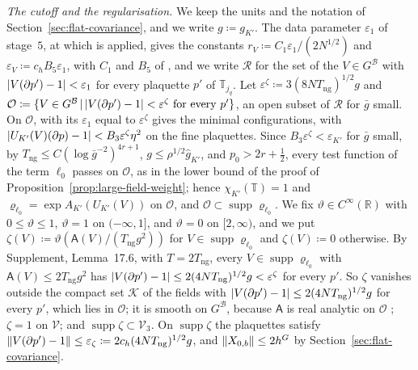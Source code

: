 \documentclass[11pt]{preprint}
\DeclarePairedDelimiter{\abs}{\lvert}{\rvert}
\DeclarePairedDelimiter{\norm}{\lVert}{\rVert}
\numberwithin{equation}{section}
\theoremstyle{definition}
\theoremstyle{remark}
\theoremstyle{plain}
\begin{document}
\emph{The cutoff and the regularisation.} We keep the units and the notation of Section~\ref{sec:flat-covariance}, and we write $g \coloneqq g_{K'}$. The data parameter $\varepsilon_1$ of stage~$5$, at which \cite[Theorem~1, p.~279]{BalabanVAR} is applied, gives the constants $r_V \coloneqq C_1\varepsilon_1/(2N^{1/2})$ and $\varepsilon_V \coloneqq c_hB_5\varepsilon_1$, with $C_1$ and $B_5$ of \cite[(172)--(173), p.~305]{BalabanVAR}, and we write $\mathcal R$ for the set of the $V \in G^{\mathcal B}$ with $\abs{V(\partial p') - 1} < \varepsilon_1$ for every plaquette $p'$ of $\mathbb T_{j_q}$. Let $\varepsilon^\zeta \coloneqq 3(8NT_{\mathrm{ng}})^{1/2}g$ and $\mathcal O \coloneqq \{ V \in G^{\mathcal B} \,|\, \abs{V(\partial p') - 1} < \varepsilon^\zeta \text{ for every } p' \}$, an open subset of $\mathcal R$ for $\bar g$ small. On $\mathcal O$, \cite[Theorem~1]{BalabanVAR} with its $\varepsilon_1$ equal to $\varepsilon^\zeta$ gives the minimal configurations, with $\abs{U_{K'}(V)(\partial p) - 1} < B_3\varepsilon^\zeta\eta^2$ on the fine plaquettes. Since $B_3\varepsilon^\zeta < \varepsilon_{K'}$ for $\bar g$ small, by $T_{\mathrm{ng}} \leq C(\log\bar g^{-2})^{4r+1}$, $g \leq \rho^{1/2}\hat g_{K'}$, and $p_0 > 2r + \frac12$, every test function of the term $\ell_0$ passes on $\mathcal O$, as in the lower bound of the proof of Proposition~\ref{prop:large-field-weight}; hence $\chi_{K'}(\mathbb T) = 1$ and $\varrho_{\ell_0} = \exp A_{K'}(U_{K'}(V))$ on $\mathcal O$, and $\mathcal O \subset \operatorname{supp}\varrho_{\ell_0}$. We fix $\vartheta \in C^\infty(\mathbb R)$ with $0 \leq \vartheta \leq 1$, $\vartheta = 1$ on $(-\infty, 1]$, and $\vartheta = 0$ on $[2, \infty)$, and we put $\zeta(V) \coloneqq \vartheta(\mathsf A(V)/(T_{\mathrm{ng}}g^2))$ for $V \in \operatorname{supp}\varrho_{\ell_0}$ and $\zeta(V) \coloneqq 0$ otherwise. By Supplement, Lemma~17.6, with $T = 2T_{\mathrm{ng}}$, every $V \in \operatorname{supp}\varrho_{\ell_0}$ with $\mathsf A(V) \leq 2T_{\mathrm{ng}}g^2$ has $\abs{V(\partial p') - 1} \leq 2(4NT_{\mathrm{ng}})^{1/2}g < \varepsilon^\zeta$ for every $p'$. So $\zeta$ vanishes outside the compact set $\mathcal K$ of the fields with $\abs{V(\partial p') - 1} \leq 2(4NT_{\mathrm{ng}})^{1/2}g$ for every $p'$, which lies in $\mathcal O$; it is smooth on $G^{\mathcal B}$, because $\mathsf A$ is real analytic on $\mathcal O$ \cite[Proposition~9, p.~309]{BalabanVAR}; $\zeta = 1$ on $\mathcal V$; and $\operatorname{supp}\zeta \subset \mathcal V_3$. On $\operatorname{supp}\zeta$ the plaquettes satisfy $\norm{V(\partial p') - 1} \leq \varepsilon_\zeta \coloneqq 2c_h(4NT_{\mathrm{ng}})^{1/2}g$, and $\norm{X_{0,b}} \leq 2h^G$ by Section~\ref{sec:flat-covariance}.
\end{document}
